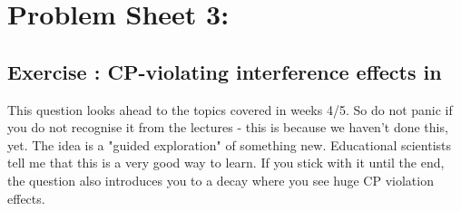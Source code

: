 \section*{Problem Sheet 3:}
\label{sec:ps3}
\setcounter{psThreeQuestions}{0}
\renewcommand{\NewQuestion}[1]{\subsection*{Exercise : #1}}


\NewQuestion{CP-violating interference effects in \prt{B^{-} \to DK^{-}}}
This question looks ahead to the topics covered in weeks 4/5. So do not panic if you do not recognise it from the lectures - this is because we haven't done this, yet. The idea is a "guided exploration" of something new. Educational scientists tell me that this is a very good way to learn.
If you stick with it until the end, the question also introduces you to a decay where you see huge CP violation effects.

